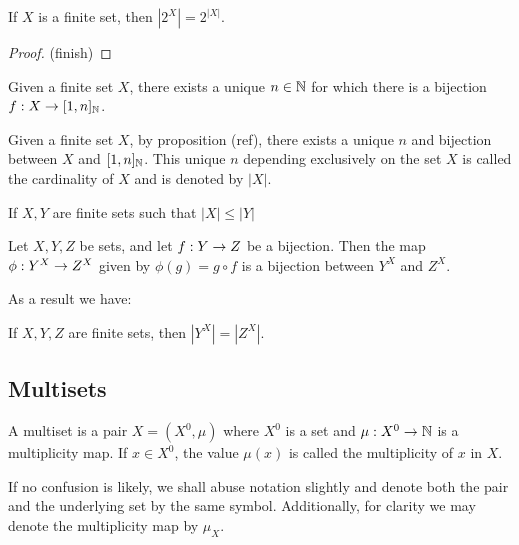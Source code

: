 \begin{proposition}
	If $X$ is a finite set, then $|2^X| =2^{|X|}$.
\end{proposition}

\begin{proof}
	(finish)
\end{proof}

\begin{proposition}\label{uniquesetcardinality}
	Given a finite set $X$, there exists a unique $n \in \mathbb{N}$ for which there is a bijection $f:X \rightarrow [1, n]_{\mathbb{N}}$.
\end{proposition}

\begin{definition}\label{cardinality}
	Given a finite set $X$, by proposition (ref), there exists a unique $n$ and bijection between $X$ and $[1, n]_{\mathbb{N}}$. This unique $n$ depending exclusively on the set $X$ is called the cardinality of $X$ and is denoted by $|X|$.
\end{definition}

\begin{proposition}
	If $X, Y$ are finite sets such that $|X| \leq |Y|$ 
\end{proposition}

\begin{proposition}
	Let $X, Y, Z$ be sets, and let $f:Y\rightarrow Z$ be a bijection. Then the map $\phi:Y^X \rightarrow Z^X$ given by $\phi(g)=g\circ f$ is a bijection between $Y^X$ and $Z^X$.
\end{proposition}

As a result we have:

\begin{coro}
	If $X, Y, Z$ are finite sets, then $|Y^X|=|Z^X|$.
\end{coro}

\subsection{Multisets}

\begin{definition}
	A multiset is a pair $X = (X^0, \mu)$ where $X^0$ is a set and $\mu: X^0 \rightarrow \mathbb{N}$ is a multiplicity map. If $x \in X^0$, the value $\mu(x)$ is called the multiplicity of $x$ in $X$.
\end{definition}

If no confusion is likely, we shall abuse notation slightly and denote both the pair and the underlying set by the same symbol. Additionally, for clarity we may denote the multiplicity map by $\mu_X$.

